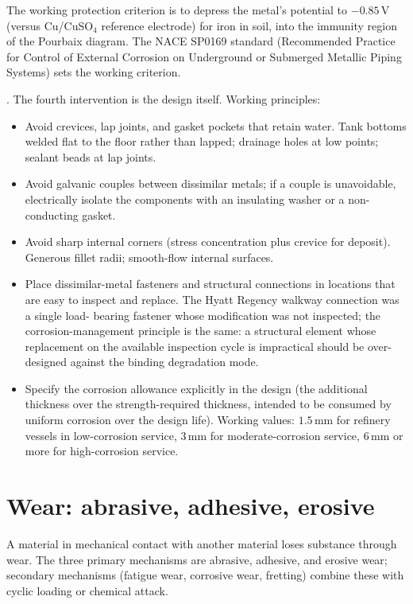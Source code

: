 The working protection criterion is to depress the metal's potential
to $-0.85\,\text{V}$ (versus Cu/CuSO$_4$ reference electrode) for
iron in soil, into the immunity region of the Pourbaix diagram. The
NACE SP0169 standard (Recommended Practice for Control of External
Corrosion on Underground or Submerged Metallic Piping Systems) sets
the working criterion.

. The fourth intervention is the design
itself. Working principles:

\begin{itemize}[leftmargin=*]
\item Avoid crevices, lap joints, and gasket pockets that retain
  water. Tank bottoms welded flat to the floor rather than lapped;
  drainage holes at low points; sealant beads at lap joints.
\item Avoid galvanic couples between dissimilar metals; if a couple
  is unavoidable, electrically isolate the components with an
  insulating washer or a non-conducting gasket.
\item Avoid sharp internal corners (stress concentration plus crevice
  for deposit). Generous fillet radii; smooth-flow internal surfaces.
\item Place dissimilar-metal fasteners and structural connections in
  locations that are easy to inspect and replace. The Hyatt Regency
  walkway connection \cite{acc:nbs-hyatt-1982} was a single load-
  bearing fastener whose modification was not inspected; the
  corrosion-management principle is the same: a structural element
  whose replacement on the available inspection cycle is impractical
  should be over-designed against the binding degradation mode.
\item Specify the corrosion allowance explicitly in the design (the
  additional thickness over the strength-required thickness, intended
  to be consumed by uniform corrosion over the design life). Working
  values: $1.5\,\text{mm}$ for refinery vessels in low-corrosion
  service, $3\,\text{mm}$ for moderate-corrosion service, $6\,\text{mm}$
  or more for high-corrosion service.
\end{itemize}

\section{Wear: abrasive, adhesive, erosive}

A material in mechanical contact with another material loses substance
through wear. The three primary mechanisms are abrasive, adhesive, and
erosive wear; secondary mechanisms (fatigue wear, corrosive wear,
fretting) combine these with cyclic loading or chemical attack.

